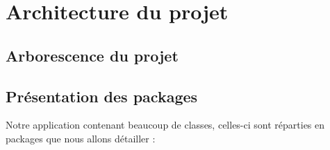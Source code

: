 \chapter{Architecture du projet}

	\section{Arborescence du projet}



	\section{Présentation des packages}

		Notre application contenant beaucoup de classes, celles-ci sont réparties en packages que nous allons détailler :

